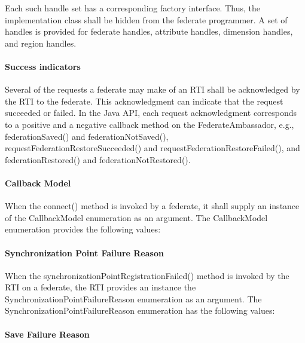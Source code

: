 \begin{compactstdpage}
    Each such handle set has a corresponding factory interface. Thus, the implementation class shall be hidden from the federate programmer. A set of handles is provided for federate handles, attribute handles, dimension handles, and region handles.

    \paragraph{Success indicators}

    Several of the requests a federate may make of an RTI shall be acknowledged by the RTI to the federate. This acknowledgment can indicate that the request succeeded or failed. In the Java API, each request acknowledgment corresponds to a positive and a negative callback method on the FederateAmbassador, e.g., federationSaved() and federationNotSaved(), requestFederationRestoreSucceeded() and requestFederationRestoreFailed(), and federationRestored() and federationNotRestored().

    \paragraph{Callback Model}

    When the connect() method is invoked by a federate, it shall supply an instance of the CallbackModel enumeration as an argument. The CallbackModel enumeration provides the following values:


    \paragraph{Synchronization Point Failure Reason}

    When the synchronizationPointRegistrationFailed() method is invoked by the RTI on a federate, the RTI provides an instance the SynchronizationPointFailureReason enumeration as an argument. The SynchronizationPointFailureReason enumeration has the following values:


    \paragraph{Save Failure Reason}


\end{compactstdpage}
